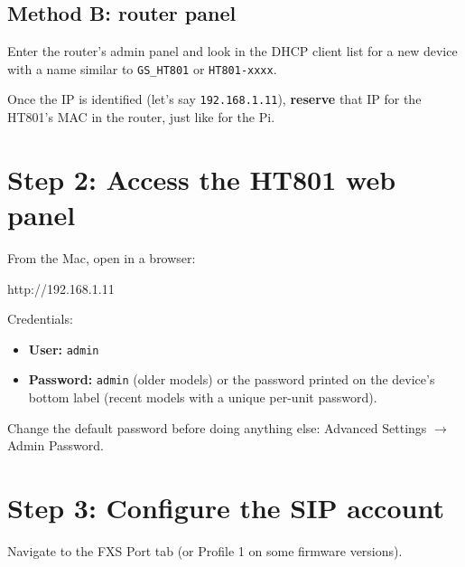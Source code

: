 \subsection{Method B: router panel}

Enter the router's admin panel and look in the DHCP client list for a new device with a name similar to \texttt{GS\_HT801} or \texttt{HT801-xxxx}.

Once the IP is identified (let's say \texttt{192.168.1.11}), \textbf{reserve} that IP for the HT801's MAC in the router, just like for the Pi.

\section{Step 2: Access the HT801 web panel}

From the Mac, open in a browser:

\begin{plaincode}
http://192.168.1.11
\end{plaincode}

Credentials:

\begin{itemize}
  \item \textbf{User:} \texttt{admin}
  \item \textbf{Password:} \texttt{admin} (older models) or the password printed on the device's bottom label (recent models with a unique per-unit password).
\end{itemize}

\begin{warning}
Change the default password before doing anything else: \textsf{Advanced Settings} $\to$ \textsf{Admin Password}.
\end{warning}

\section{Step 3: Configure the SIP account}

Navigate to the \textsf{FXS Port} tab (or \textsf{Profile 1} on some firmware versions).

